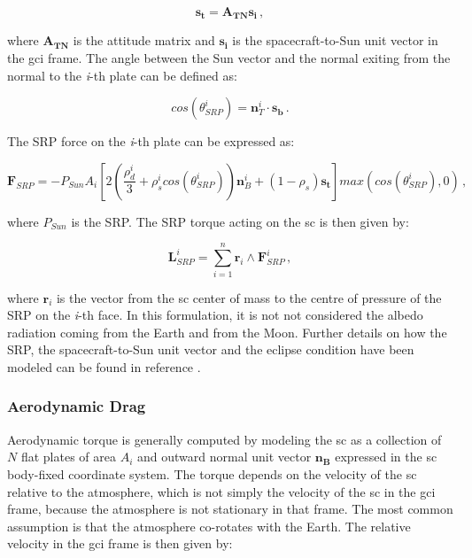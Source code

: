 \begin{equation}
  \mathbf{s_t} = \mathbf{A_{TN}} \mathbf{s_i} \,,
\end{equation}

where $\mathbf{A_{TN}}$ is the attitude matrix and $\mathbf{s_i}$ is the spacecraft-to-Sun unit vector in the \acrshort{gci} frame.
The angle between the Sun vector and the normal exiting from the normal to the \textit{i}-th plate can be defined as:

\begin{equation}
  cos(\theta_{SRP}^{i}) = \mathbf{n}_{T}^{i} \cdot \mathbf{s_b} \,.
\end{equation}

The SRP force on the \textit{i}-th plate can be expressed as:

\begin{equation}
  \mathbf{F}_{SRP} = - P_{Sun}A_{i}\left[ 2\left( \frac{\rho_{d}^{i}}{3} + \rho_{s}^{i}cos(\theta_{SRP}^{i}) \right) \mathbf{n}_{B}^{i} + (1 -\rho_{s}) \mathbf{s_t} \right] max(cos(\theta_{SRP}^{i}),0) \,,
\end{equation}

where $P_{Sun}$ is the SRP.
The SRP torque acting on the \acrshort{sc} is then given by:

\begin{equation}
  \mathbf{L}_{SRP}^{i} = \sum\limits_{i=1}^n  \mathbf{r}_{i} \wedge \mathbf{F}_{SRP}^{i} \,,
\end{equation}

where $\mathbf{r}_{i}$ is the vector from the \acrshort{sc} center of mass to the centre of pressure of the SRP on the \textit{i}-th face.
In this formulation, it is not not considered the albedo radiation coming from the Earth and from the Moon.
Further details on how the SRP, the spacecraft-to-Sun unit vector and the eclipse condition have been modeled can be found in reference \cite{Markley2014}.

\subsubsection{Aerodynamic Drag}
Aerodynamic torque is generally computed by modeling the \acrshort{sc} as a collection of $N$ flat plates of area $A_i$ and outward normal unit vector $\mathbf{n_{B}}$ expressed in the \acrshort{sc} body-fixed coordinate system. The torque depends on the velocity of the \acrshort{sc} relative to the atmosphere, which is not simply the velocity of the \acrshort{sc} in the \acrshort{gci} frame, because the atmosphere is not stationary in that frame.
The most common assumption is that the atmosphere co-rotates with the Earth. The relative velocity in the \acrshort{gci} frame is then given by:


